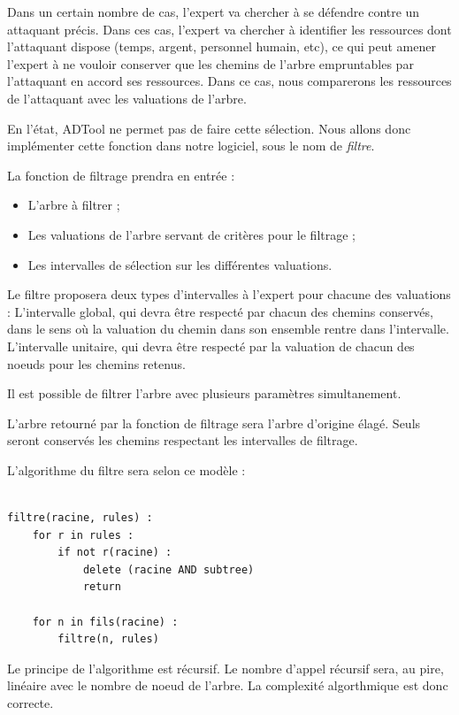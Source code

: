 		Dans un certain nombre de cas, l'expert va chercher à se défendre contre un attaquant précis. Dans ces cas, l'expert va chercher à identifier les ressources dont l'attaquant dispose (temps, argent, personnel humain, etc), ce qui peut amener l'expert à ne vouloir conserver que les chemins de l'arbre empruntables par 				l'attaquant en accord ses ressources. Dans ce cas, nous comparerons les ressources de l'attaquant avec les valuations de l'arbre.

		En l'état, ADTool ne permet pas de faire cette sélection. Nous allons donc implémenter cette fonction dans notre logiciel, sous le nom de \textit{filtre}.

		La fonction de filtrage prendra en entrée : 
		\begin{itemize}
		\item L'arbre à filtrer ;
		\item Les valuations de l'arbre servant de critères pour le filtrage ;
		\item Les intervalles de sélection sur les différentes valuations.
		\end{itemize}

		Le filtre proposera deux types d'intervalles à l'expert pour chacune des valuations :
		L'intervalle global, qui devra être respecté par chacun des chemins conservés, dans le sens où la valuation du chemin dans son ensemble rentre dans l'intervalle.
		L'intervalle unitaire, qui devra être respecté par la valuation de chacun des noeuds pour les chemins retenus.

		Il est possible de filtrer l'arbre avec plusieurs paramètres simultanement.
		
		L'arbre retourné par la fonction de filtrage sera l'arbre d'origine élagé. Seuls seront conservés les chemins respectant les intervalles de filtrage.
		
		L'algorithme du filtre sera selon ce modèle :

		\begin{lstlisting}

filtre(racine, rules) :
	for r in rules :
		if not r(racine) :
			delete (racine AND subtree)
			return

	for n in fils(racine) :
		filtre(n, rules)

\end{lstlisting}
	
		Le principe de l'algorithme est récursif.
		Le nombre d'appel récursif sera, au pire, linéaire avec le nombre de noeud de l'arbre.
		La complexité algorthmique est donc correcte.

